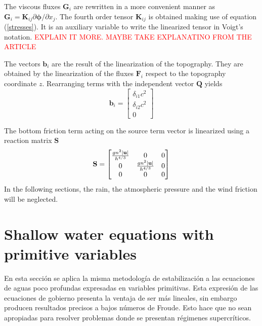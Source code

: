The viscous fluxes $\mathbf{G}_i$ are rewritten in a more convenient manner as ${\mathbf{G}_i = \mathbf{K}_{ij} \partial\bm{\phi}/\partial x_j}$. The fourth order tensor $\mathbf{K}_{ij}$ is obtained making use of equation (\ref{stresses}). It is an auxiliary variable to write the linearized tensor in Voigt's notation. \textcolor{red}{EXPLAIN IT MORE. MAYBE TAKE EXPLANATINO FROM THE ARTICLE}


The vectors $\mathbf{b}_i$ are the result of the linearization of the topography. They are obtained by the linearization of the fluxes $\mathbf{F}_i$ respect to the topography coordinate $z$. Rearranging terms with the independent vector $\mathbf{Q}$ yields
\begin{equation}
    \mathbf{b}_i = \left[\begin{matrix}
        \delta_{i1} c^2 \\
        \delta_{i2} c^2 \\
        0
    \end{matrix}\right]
\end{equation}


The bottom friction term acting on the source term vector is linearized using a reaction matrix $\mathbf{S}$
\begin{equation}
\mathbf{S} = \left[\begin{matrix}
    \frac{gn^2\lvert\mathbf{u}\rvert}{h^{4/3}} & 0 & 0 \\
    0 & \frac{gn^2\lvert\mathbf{u}\rvert}{h^{4/3}} & 0 \\
    0 & 0 & 0
\end{matrix}\right]
\end{equation}
In the following sections, the rain, the atmospheric pressure and the wind friction will be neglected.







\section{Shallow water equations with primitive variables}

En esta sección se aplica la misma metodología de estabilización a las ecuaciones de aguas poco profundas expresadas en variables primitivas. Esta expresión de las ecuaciones de gobierno presenta la ventaja de ser más lineales, sin embargo producen resultados precisos a bajos números de Froude. Esto hace que no sean apropiadas para resolver problemas donde se presentan régimenes supercríticos. 

